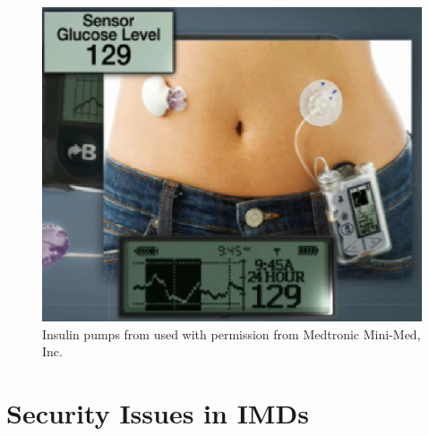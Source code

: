 \begin{figure}[!t]
\includegraphics[scale=0.75]{p1.eps}
\caption{Insulin pumps from \cite{hanselman} used with permission from Medtronic Mini-Med, Inc.}
\label{fig:3}
\end{figure}

\section{Security Issues in IMDs}
\label{sec:2}

